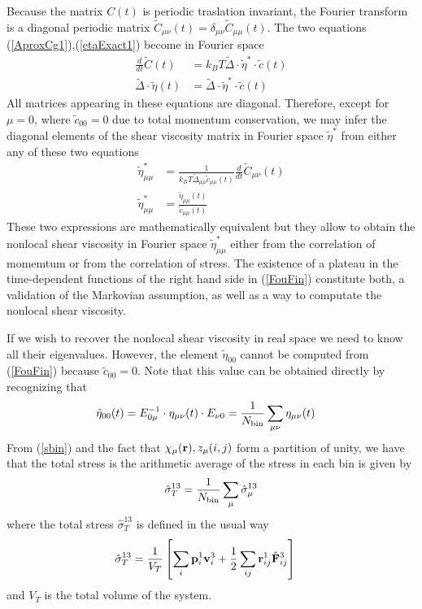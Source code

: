 \documentclass[b5paper,openright,11pt]{book}
\newcommand{\esc}{\!\cdot\!}
\begin{document}
Because  the  matrix  $C(t)$  is periodic  traslation  invariant,  the
Fourier     transform     is     a    diagonal     periodic     matrix
$\tilde{C}_{\mu\nu}(t)=\delta_{\mu\nu}\tilde{C}_{\mu\mu}(t)$.
The two equations (\ref{AproxCg1}),(\ref{etaExact1}) become in Fourier space
\begin{align}
  \frac{d}{dt}\tilde{C}(t)&=  k_BT\tilde{\Delta}\esc \tilde{\eta}^*\esc \tilde{c}(t)
\nonumber\\
 \tilde{\Delta}\esc \tilde{\eta}(t) &=\tilde{\Delta}\esc \tilde{\eta}^*\esc \tilde{c}(t)
\label{Fou1}
\end{align}
All matrices  appearing in  these equations are  diagonal.  Therefore,
except  for $\mu=0$,  where $\tilde{c}_{00}=0$  due to  total momentum
conservation,  we  may  infer  the  diagonal  elements  of  the  shear
viscosity matrix in Fourier space  $\tilde{\eta}^*$ from either any of
these two equations
\begin{align}
  \tilde{\eta}^*_{\mu\mu}&= \frac{1}{ k_BT\tilde{\Delta}_{\mu\mu}  \tilde{c}_{\mu\mu}(t)}\frac{d}{dt}\tilde{C}_{\mu\nu}(t)
\nonumber\\
\tilde{\eta}_{\mu\mu}^*&=\frac{\tilde{\eta}_{\mu\mu}(t) }{\tilde{c}_{\mu\mu}(t)}
\label{FouFin}
\end{align}
These two expressions are mathematically  equivalent but they allow to
obtain   the    nonlocal   shear    viscosity   in    Fourier   space
$\tilde{\eta}_{\mu\mu}^*$ either  from the correlation of  momemtum or
from the  correlation of stress.   The existence  of a plateau  in the
time-dependent  functions of  the  right hand  side in  (\ref{FouFin})
constitute both, a validation of  the Markovian assumption, as well as
a way to computate the nonlocal shear viscosity.

If we wish  to recover the nonlocal shear viscosity  in real space we
need   to  know   all   their  eigenvalues.    However,  the   element
$\tilde{\eta}_{00}$  cannot be  computed  from (\ref{FouFin})  because
$\tilde{c}_{00}=0$.  Note that this value  can be obtained directly by
recognizing that
\begin{align}
    \tilde{\eta}_{00}(t)&=E_{0\mu}^{-1}\cdot\eta_{\mu\nu}(t)\cdot E_{\nu 0}=\frac{1}{N_{\rm bin}}
\sum_{\mu\nu}\eta_{\mu\nu}(t)
\label{eta00}
\end{align}
From
(\ref{sbin}) and the fact that $\chi_\mu({\bf r}),z_{\mu}(i,j)$ form a partition of unity, we have
that the total stress is the arithmetic average of the stress in each bin is given by
\begin{align}
\hat{\sigma}_T^{13}=\frac{1}{N_{\rm bin}}\sum_\mu\hat{\sigma}_\mu^{13}
\label{TotStress2}
\end{align}
where the  total stress $\hat\sigma_T^{13}$ is defined  in the usual way
\begin{align}
\hat{\sigma}_T^{13}&=\frac{1}{V_T}\left[\sum_{i}{\bf p}^1_i{\bf v}^3_i
+\frac{1}{2}\sum_{ij}{\bf r}^1_{ij}\hat{\bf F}^3_{ij}\right]
\label{TotStress}
\end{align}
and $V_T$ is the total volume of the system. 
\end{document}
